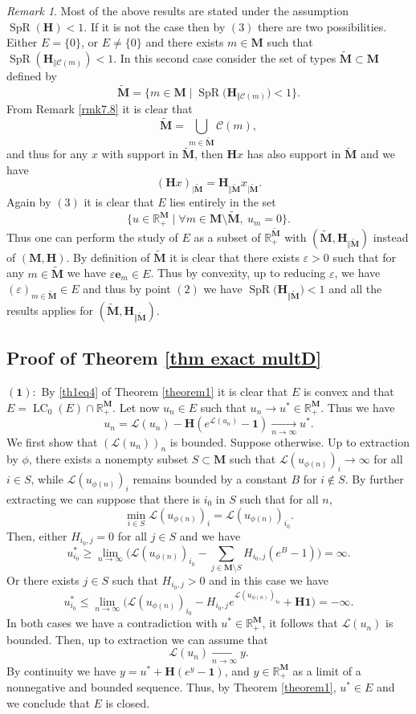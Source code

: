 \documentclass[reqno,final,11pt]{amsart}
\theoremstyle{plain}
\theoremstyle{definition}
\theoremstyle{remark}
\newtheorem{remark}[theorem]{Remark}
\newcommand{\R}{\mathds{R}}
\newcommand{\M}{\bm{M}}
\newcommand{\C}{\mathcal{C}}
\renewcommand{\L}{\bm{\mathscr{L}}}
\newcommand{\ones}{\bm{1}}
\newcommand{\e}{\bm{e}}
\renewcommand{\H}{\bm{H}}
\newcommand{\pos}{\R_+^{\M}}
\newcommand{\CE}{\ce_{0}}
\DeclareMathOperator{\spr}{SpR}
\DeclareMathOperator{\ce}{LC}
\begin{document}
\begin{remark}\label{rmq5.7}
	Most of the above results are stated under the assumption $\spr(\H)<1$. If it is not the case then by $(3)$ there are two possibilities. Either $E = \{0\}$, or $E \neq \{0\}$ and there exists $m\in\M$ such that $\spr(\H_{\Vert \C(m)})<1$. In this second case consider the set of types $\tilde{\M}\subset \M$ defined by \[ \tilde{\M} = \{ m\in\M \mid \spr\big(\H_{\Vert \C(m)}\big)<1\}.\] From Remark \ref{rmk7.8} it is clear that \[\tilde{\M} = \bigcup_{m\in\tilde{\M}} \C(m),\] and thus for any $x$ with support in $\tilde{\M}$, then $\H x$ has also support in $\tilde{\M}$ and we have \[(\H x)_{\vert \tilde{\M}} = \H_{\Vert \tilde{\M}} x_{\vert \tilde{\M}}.\] Again by $(3)$ it is clear that $E$ lies entirely in the set \[\{u \in\pos \mid \forall m\in \M\setminus \tilde{\M}, \ u_m =0\}.\]
	Thus one can perform the study of $E$ as a subset of $\R_+^{\tilde{\M}}$ with $(\tilde{\M},\H_{\Vert \tilde{\M}})$ instead of $(\M,\H)$. By definition of $\tilde{\M}$ it is clear that there exists $\varepsilon>0$ such that for any $m \in \tilde{\M}$ we have $\varepsilon \e_m \in E$. Thus by convexity, up to reducing $\varepsilon$, we have $(\varepsilon)_{m\in\tilde{\M}} \in E$ and thus by point $(2)$ we have $\spr\big(\H_{\Vert\tilde{\M}}\big)<1$ and all the results applies for $(\tilde{\M},\H_{\Vert \tilde{\M}})$.
\end{remark}

\subsection{Proof of Theorem \ref{thm exact multD}}\label{section6.7}

$\bm{(1):}$ By \eqref{th1eq4} of Theorem \ref{theorem1} it is clear that $E$ is convex and that $E = \CE(E)\cap\R_+^{\M}$. Let now $u_n \in E$ such that $u_n \to u^*\in\pos$. Thus we have 
	\begin{equation*}
		u_n = \L(u_n) - \H(e^{\L(u_n)}-\ones) \xrightarrow[n\to\infty]{} u^*.
	\end{equation*}
	We first show that $(\L(u_n))_n$ is bounded. Suppose otherwise. Up to extraction by $\phi$, there exists a nonempty subset $S\subset\M$ such that $\L(u_{\phi(n)})_i\to\infty$ for all $i\in S$, while $\L(u_{\phi(n)})_i$ remains bounded by a constant $B$ for $i\notin S$.
	By further extracting we can suppose that there is $i_0$ in $S$ such that for all $n$,
	\[ \min_{i\in S} \L(u_{\phi(n)})_i = \L(u_{\phi(n)})_{i_0}.\]
	Then, either $H_{i_0,j} = 0$ for all $j\in S$ and we have 
	\[u^*_{i_0} \geq \lim_{n\to\infty} \Big(\L(u_{\phi(n)})_{i_0} - \sum_{j\in\M\setminus S} H_{i_0,j} (e^B-1)\Big) = \infty.\]
	Or there exists $j\in S$ such that $H_{i_0,j} >0$ and in this case we have
	\[u^*_{i_0} \leq \lim_{n\to\infty} \Big(\L(u_{\phi(n)})_{i_0} - H_{i_0,j}e^{\L(u_{\phi(n)})_{i_0}} + \H\ones \Big)  = -\infty.\] 
	In both cases we have a contradiction with $u^*\in\pos$, it follows that $\L(u_n)$ is bounded. Then, up to extraction we can assume that
	\[\L(u_n) \xrightarrow[n\to\infty]{} y.\]
	By continuity we have $y = u^* + \H(e^{y}-\ones)$, and $y\in\pos$ as a limit of a nonnegative and bounded sequence. Thus, by Theorem \ref{theorem1}, $u^*\in E$ and we conclude that $E$ is closed.
	
\end{document}
